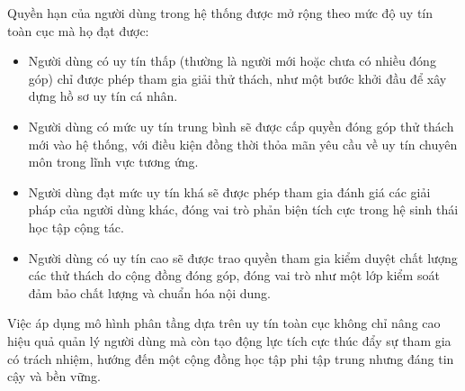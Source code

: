 Quyền hạn của người dùng trong hệ thống được mở rộng theo mức độ uy tín toàn cục mà họ đạt được:

\begin{itemize}
  \item Người dùng có uy tín thấp (thường là người mới hoặc chưa có nhiều đóng góp) chỉ được phép tham gia giải thử thách, như một bước khởi đầu để xây dựng hồ sơ uy tín cá nhân.
  \item Người dùng có mức uy tín trung bình sẽ được cấp quyền đóng góp thử thách mới vào hệ thống, với điều kiện đồng thời thỏa mãn yêu cầu về uy tín chuyên môn trong lĩnh vực tương ứng.
  \item Người dùng đạt mức uy tín khá sẽ được phép tham gia đánh giá các giải pháp của người dùng khác, đóng vai trò phản biện tích cực trong hệ sinh thái học tập cộng tác.
  \item Người dùng có uy tín cao sẽ được trao quyền tham gia kiểm duyệt chất lượng các thử thách do cộng đồng đóng góp, đóng vai trò như một lớp kiểm soát đảm bảo chất lượng và chuẩn hóa nội dung.
\end{itemize}

Việc áp dụng mô hình phân tầng dựa trên uy tín toàn cục không chỉ nâng cao hiệu quả quản lý người dùng mà còn tạo động lực tích cực thúc đẩy sự tham gia có trách nhiệm, hướng đến một cộng đồng học tập phi tập trung nhưng đáng tin cậy và bền vững.